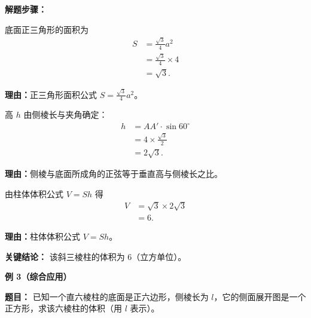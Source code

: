 \begin{examplebox}
	\textbf{\textcolor{CExample}{解题步骤：}}
	\begin{description}[style=nextline, leftmargin=2.8em, labelsep=0.5em, itemsep=0.45em]
		\item[\textbf{第一步（算底面积）：}] 底面正三角形的面积为
			\[
				\begin{aligned}
					S &= \frac{\sqrt{3}}{4}a^2 \\
					&= \frac{\sqrt{3}}{4} \times 4 \\
					&= \sqrt{3}.
			\end{aligned}
			\]
			\par\textbf{理由：}正三角形面积公式 $S = \frac{\sqrt{3}}{4}a^2$。
		\item[\textbf{第二步（求垂直高）：}] 高 $h$ 由侧棱长与夹角确定：
			\[
				\begin{aligned}
					h &= AA' \cdot \sin 60^\circ \\
					&= 4 \times \frac{\sqrt{3}}{2} \\
					&= 2\sqrt{3}.
			\end{aligned}
			\]
			\par\textbf{理由：}侧棱与底面所成角的正弦等于垂直高与侧棱长之比。
		\item[\textbf{第三步（代公式求体积）：}] 由柱体体积公式 $V=Sh$ 得
			\[
				\begin{aligned}
					V &= \sqrt{3} \times 2\sqrt{3} \\
					&= 6.
			\end{aligned}
			\]
			\par\textbf{理由：}柱体体积公式 $V=Sh$。
	\end{description}

	\textbf{\textcolor{CExample}{关键结论：}}
	该斜三棱柱的体积为 $6$（立方单位）。

	\medskip
	\textbf{\textcolor{CExample}{例 3（综合应用）}}

	\textbf{\textcolor{CExample}{题目：}}
	已知一个直六棱柱的底面是正六边形，侧棱长为 $l$，它的侧面展开图是一个正方形，求该六棱柱的体积（用 $l$ 表示）。


\end{examplebox}
